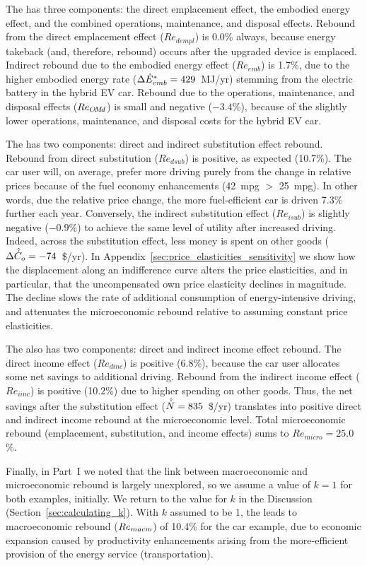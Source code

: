 \documentclass[12pt]{article}\usepackage[]{graphicx}\usepackage[]{xcolor}
\begin{document}
The \empleffect{} has three components:
the direct emplacement effect,
the embodied energy effect, and
the combined operations, maintenance, and disposal effects.
Rebound from the direct emplacement effect
($Re_{dempl}$) is 0.0\% always,
because energy takeback (and, therefore, rebound)
occurs after the upgraded device is emplaced.
Indirect rebound due to the embodied energy effect
($Re_{emb}$) is 1.7\%,
due to the higher embodied energy rate
($\Delta {\dot{E}}^*_{emb} = 429$~MJ/yr)
stemming from the electric battery in the hybrid EV car.
Rebound due to the operations, maintenance, and disposal effects
($Re_{O\!M\!d}$) is small and negative
($-3.4$\%),
because of the slightly lower operations, maintenance, and disposal costs
for the hybrid EV car.

The \subeffect{} has two components:
direct and indirect substitution effect rebound.
Rebound from direct substitution ($Re_{dsub}$) is
positive, as expected (10.7\%).
The car user will, on average, prefer more driving purely
from the change in relative prices because of the fuel economy enhancements
(42~mpg $>$ 25~mpg).
In other words,
due the relative price change,
the more fuel-efficient car is driven 7.3\% further
each year.
Conversely, the indirect substitution effect ($Re_{isub}$)
is slightly negative ($-0.9$\%)
to achieve the same level of utility after increased driving.
Indeed, across the substitution effect,
less money is spent on other goods
($\Delta \hat{\dot{C}}_o = -74$~\$/yr).
In Appendix~\ref{sec:price_elasticities_sensitivity} we show how the
displacement along an indifference curve alters the price elasticities,
and in particular, that the uncompensated own price elasticity declines
in magnitude. The decline slows the rate of additional consumption of
energy-intensive driving, and attenuates the microeconomic rebound
relative to assuming constant price elasticities.

The \inceffect{} also has two components:
direct and indirect income effect rebound.
The direct income effect
($Re_{dinc}$) is positive
(6.8\%),
because the car user allocates some
net savings to additional driving.
Rebound from the indirect income effect
($Re_{iinc}$) is positive (10.2\%)
due to higher spending on other goods.
Thus, the net savings after the substitution effect
($\hat{\dot{N}} = 835$~\$/yr)
translates into positive direct and indirect income
rebound at the microeconomic level.
Total microeconomic rebound (emplacement, substitution, and income effects)
sums to $Re_{micro} = 25.0$\%.

Finally, in Part~I we noted that
the link between macroeconomic and microeconomic rebound
is largely unexplored,
so we assume a value of $k = 1$ for both examples, initially.
We return to the value for $k$
in the Discussion (Section~\ref{sec:calculating_k}).
With $k$ assumed to be 1,
the \macroeffect{} leads to macroeconomic rebound
($Re_{macr\!o}$) of 10.4\%
for the car example,
due to economic expansion caused by
productivity enhancements arising from the more-efficient provision of the
energy service (transportation).
\end{document}
